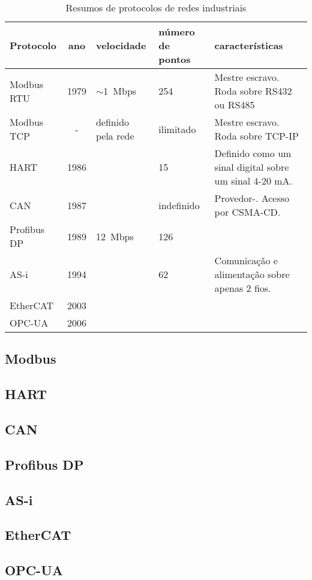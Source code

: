 \begin{table}[h]
    \caption{Resumos de protocolos de redes industriais}\label{tab:protocolos}
    \begin{tabular}{l|cp{20mm}p{20mm}p{35mm}}
        \hline
        Protocolo & ano & velocidade & número de pontos & características\\
        \hline
        Modbus RTU & 1979 & $\sim$1~Mbps & 254 & Mestre escravo. Roda sobre RS432 ou RS485\\
        Modbus TCP & - & definido pela rede & ilimitado & Mestre escravo. Roda sobre TCP-IP\\
        HART & 1986 & & 15 & Definido como um sinal digital sobre um sinal 4-20 mA.\\
        CAN & 1987 & & indefinido & Provedor-. Acesso por CSMA-CD.\\
        Profibus DP & 1989 & 12~Mbps & 126 & \\
        AS-i & 1994 & & 62 & Comunicação e alimentação sobre apenas 2 fios.\\
        EtherCAT & 2003 & & & \\
        OPC-UA & 2006 & & & \\
        \hline
    \end{tabular}
\end{table}

\subsection{Modbus}



\subsection{HART}



\subsection{CAN}



\subsection{Profibus DP}



\subsection{AS-i}



\subsection{EtherCAT}



\subsection{OPC-UA}


